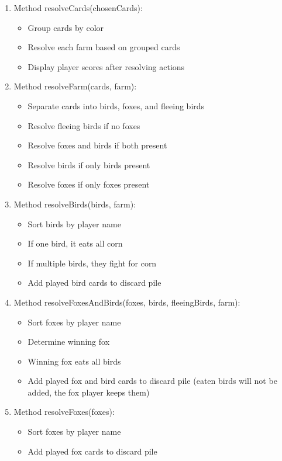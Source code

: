 \documentclass[conference]{IEEEtran}
\begin{document}
\begin{enumerate}
    \item Method resolveCards(chosenCards):
    \begin{itemize}
        \item Group cards by color
        \item Resolve each farm based on grouped cards
        \item Display player scores after resolving actions
    \end{itemize}

    \item Method resolveFarm(cards, farm):
    \begin{itemize}
        \item Separate cards into birds, foxes, and fleeing birds
        \item Resolve fleeing birds if no foxes
        \item Resolve foxes and birds if both present
        \item Resolve birds if only birds present
        \item Resolve foxes if only foxes present
    \end{itemize}

    \item Method resolveBirds(birds, farm):
    \begin{itemize}
        \item Sort birds by player name
        \item If one bird, it eats all corn
        \item If multiple birds, they fight for corn
        \item Add played bird cards to discard pile
    \end{itemize}

    \item Method resolveFoxesAndBirds(foxes, birds, fleeingBirds, farm):
    \begin{itemize}
        \item Sort foxes by player name
        \item Determine winning fox
        \item Winning fox eats all birds
        \item Add played fox and bird cards to discard pile (eaten birds will not be added, the fox player keeps them)
    \end{itemize}

    \item Method resolveFoxes(foxes):
    \begin{itemize}
        \item Sort foxes by player name
        \item Add played fox cards to discard pile
    \end{itemize}


\end{enumerate}
\end{document}
